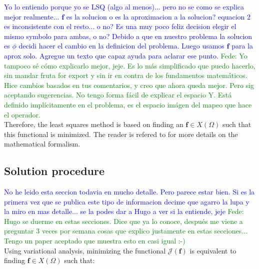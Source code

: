 \documentclass{CFD2011}
\newcommand{\Fede}[1]{\textcolor{green}{Fede: #1} \\}
\newcommand{\Pablo}[1]{\textcolor{blue}{#1}}
\begin{document}
\Pablo{Yo lo entiendo porque yo se LSQ (algo al menos)... pero no se como se explica mejor realmente... $\mathbf{f}$ es la solucion o es la aproximacion a la solucion? equacion 2 es inconsistente con el resto... o no? Es una muy poco feliz decision elegir el mismo symbolo para ambas, o no? Debido a que en nuestro problema la solucion es $\phi$ decidi hacer el cambio en la definicion del problema. Luego usamos $\mathbf{f}$ para la aprox solo.  Agregue un texto que capaz ayuda para aclarar ese punto.}
\Fede{Yo tampoco s\'e c\'omo explicarlo mejor, jeje. Es lo m\'as simplificado que puedo hacerlo, sin mandar fruta for export y sin ir en contra de los fundamentos matem\'aticos. Hice cambios basados en tus comentarios, y creo que ahora queda mejor. Pero sig aceptando sugerencias. No tengo forma f\'acil de explicar el espacio Y. Est\'a definido impl\'icitamente en el problema, es el espacio im\'agen del mapeo que hace el operador. }

Therefore, the least squares method is based on finding an $\mathbf{f} \in X(\Omega)$ such that this functional is minimized. The reader is refered to \cite{Bochev2009} for more details on the mathematical formalism. 
%
%
%

\subsection{Solution procedure}

\Pablo{No he leido esta seccion todavia en mucho detalle. Pero parece estar bien. Si es la primera vez que se publica este tipo de informacion decime que agarro la lupa y la miro en mas detalle... se la podes dar a Hugo a ver si la entiende, jeje }
\Fede{Hugo se duerme en estas secciones. Dice que ya lo conoce, despu\'es me viene a preguntar 3 veces por semana cosas que explico justamente en estas secciones... Tengo un paper aceptado que muestra esto en casi igual :-)}
Using variational analysis, minimizing the functional $\mathcal{J}(\mathbf{f})$ is equivalent to finding $\mathbf{f} \in X(\Omega)$ such that:
\end{document}

